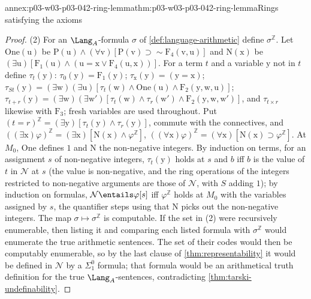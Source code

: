 \begin{annexitem}{annex:p03-w03-p03-042-ring-lemma}{thm:p03-w03-p03-042-ring-lemma}{Rings satisfying the axioms}
\begin{proof}
(2) For an \(\Lang_A\)-formula \(\sigma\) of \cref{def:language-arithmetic}
define \(\sigma^{\mathbb Z}\).  Let \(\mathrm{One}(\mathrm u)\) be
\(\mathrm P(\mathrm u)\wedge(\forall\mathrm v)[\mathrm P(\mathrm v)\supset
{\sim}\mathrm F_4(\mathrm v,\mathrm u)]\) and \(\mathrm N(\mathrm x)\) be
\((\exists\mathrm u)[\mathrm F_1(\mathrm u)\wedge(\mathrm u=\mathrm x\vee
\mathrm F_4(\mathrm u,\mathrm x))]\).  For a term \(t\) and a variable
\(\mathrm y\) not in \(t\) define \(\tau_t(\mathrm y)\): \(\tau_0(\mathrm
y)=\mathrm F_1(\mathrm y)\); \(\tau_{\mathrm x}(\mathrm y)=(\mathrm y=
\mathrm x)\); \(\tau_{St}(\mathrm y)=(\exists\mathrm w)(\exists\mathrm u)
[\tau_t(\mathrm w)\wedge\mathrm{One}(\mathrm u)\wedge\mathrm F_2(\mathrm y,
\mathrm w,\mathrm u)]\); \(\tau_{t+r}(\mathrm y)=(\exists\mathrm w)(\exists
\mathrm w')[\tau_t(\mathrm w)\wedge\tau_r(\mathrm w')\wedge\mathrm F_2(
\mathrm y,\mathrm w,\mathrm w')]\), and \(\tau_{t\times r}\) likewise with
\(\mathrm F_3\); fresh variables are used throughout.  Put
\((t=r)^{\mathbb Z}=(\exists\mathrm y)[\tau_t(\mathrm y)\wedge\tau_r(
\mathrm y)]\), commute with the connectives, and
\(((\exists\mathrm x)\varphi)^{\mathbb Z}=(\exists\mathrm x)[\mathrm N(
\mathrm x)\wedge\varphi^{\mathbb Z}]\),
\(((\forall\mathrm x)\varphi)^{\mathbb Z}=(\forall\mathrm x)[\mathrm N(
\mathrm x)\supset\varphi^{\mathbb Z}]\).  At \(M_0\), \(\mathrm{One}\)
defines \(1\) and \(\mathrm N\) the non-negative integers.  By induction on
terms, for an assignment \(s\) of non-negative integers,
\(\tau_t(\mathrm y)\) holds at \(s\) and \(b\) iff \(b\) is the value of
\(t\) in \(\mathcal N\) at \(s\) (the value is non-negative,
and the ring operations of the integers restricted to non-negative
arguments are those of \(\mathcal N\), with \(S\) adding
\(1\)); by induction on formulas, \(\mathcal N\entails
\varphi[s]\) iff \(\varphi^{\mathbb Z}\) holds at \(M_0\) with the
variables assigned by \(s\), the quantifier steps using that \(\mathrm N\)
picks out the non-negative integers.  The map \(\sigma\mapsto\sigma^{
\mathbb Z}\) is computable.  If the set in (2) were recursively enumerable,
then listing it and comparing each listed formula with \(\sigma^{\mathbb
Z}\) would enumerate the true arithmetic sentences.  The set of their
codes would then be computably enumerable, so by the last clause of
\cref{thm:representability} it would be defined in \(\mathcal N\) by a
\(\Sigma^0_1\) formula; that formula would be an arithmetical truth
definition for the true \(\Lang_A\)-sentences, contradicting
\cref{thm:tarski-undefinability}.
\end{proof}
\end{annexitem}

